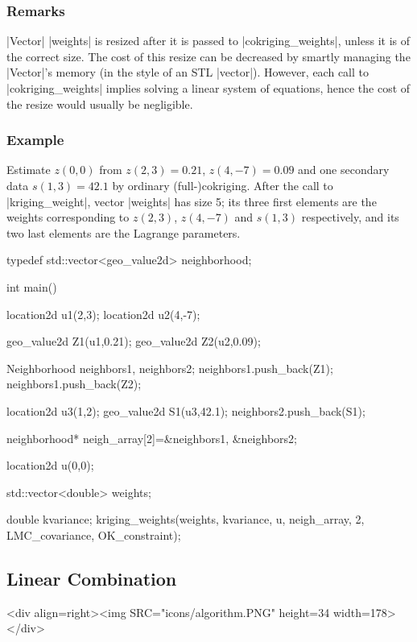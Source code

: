 \documentclass[12pt,twoside]{report}
\begin{document}
\htmlrule[CLEAR=all]  \subsubsection*{Remarks}
 |Vector| |weights| is resized after it is passed to |cokriging_weights|, unless it is of the correct size. The cost of this resize can be decreased by smartly managing the |Vector|'s memory (in the style of an STL |vector|). However, each call to |cokriging_weights| implies solving a linear system of equations, hence the cost of the resize would usually be negligible. 
 


\htmlrule[CLEAR=all]  \subsubsection*{Example}
Estimate $z(0,0)$ from $z(2,3)=0.21$, $z(4,-7)=0.09$ and one secondary data $s(1,3)=42.1$  by ordinary \mbox{(full-)cokriging}. After the call to |kriging_weight|, vector |weights| has size 5; its three first elements are the weights corresponding to $z(2,3)$, $z(4,-7)$ and $s(1,3)$ respectively, and its two last elements are the Lagrange parameters.



\begin{code}
typedef std::vector<geo_value2d> neighborhood;

int main()
{  
  location2d u1(2,3);
  location2d u2(4,-7);

  geo_value2d Z1(u1,0.21);
  geo_value2d Z2(u2,0.09); 
  
  Neighborhood neighbors1, neighbors2;
  neighbors1.push_back(Z1);
  neighbors1.push_back(Z2);

  location2d u3(1,2);
  geo_value2d S1(u3,42.1);
  neighbors2.push_back(S1);

  neighborhood* neigh_array[2]={&neighbors1, &neighbors2};

  location2d u(0,0);

  std::vector<double> weights;

  double kvariance;
  kriging_weights(weights, kvariance,
                  u, neigh_array, 2,
                  LMC_covariance, OK_constraint);
}

\end{code}








\subsection{Linear Combination}
\begin{htmlonly}
<div align=right><img SRC="icons/algorithm.PNG" height=34 width=178></div>
\end{htmlonly}
\end{document}

